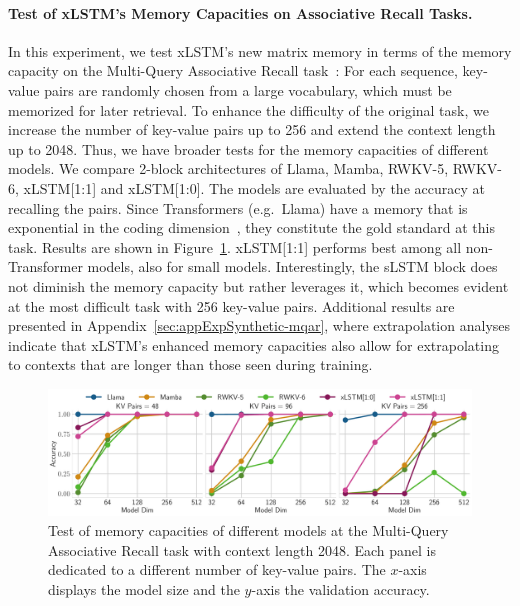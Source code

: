 \documentclass[dvipsnames]{article}
\begin{document}
\paragraph{Test of xLSTM's Memory Capacities on Associative Recall Tasks.}
In this experiment, we test xLSTM's new matrix memory in terms of the
memory capacity on the Multi-Query Associative Recall task~\citep{Arora:23arxiv}:
For each sequence, key-value pairs are randomly chosen
from a large vocabulary,
which must be memorized for later retrieval.
To enhance the difficulty of the original task, 
we increase the number of key-value pairs up 
to 256 and extend the context length up to 2048.
Thus, we have broader tests for the memory capacities of different models.
We compare 2-block architectures of 
Llama, Mamba, RWKV-5, RWKV-6, xLSTM[1:1] and xLSTM[1:0]. 
The models are evaluated by the accuracy at recalling the pairs.
Since Transformers (e.g.\ Llama) have a memory that is 
exponential in the coding dimension~\citep{Ramsauer:21}, 
they constitute the gold standard at this task.
Results are shown in Figure~\ref{fig:mqar-main}. 
xLSTM[1:1] performs best among all non-Transformer models, 
also for small models.
Interestingly, the sLSTM block does not diminish the memory capacity but rather 
leverages it, which becomes evident at the most difficult 
task with 256 key-value pairs.
Additional results are presented in Appendix~\ref{sec:appExpSynthetic-mqar},
where extrapolation analyses
indicate that xLSTM's enhanced memory capacities also allow for extrapolating to contexts that are longer than those seen during training.

\begin{figure}[h]
    \centering
    \includegraphics[width=\textwidth]{figures/MQAR_MainPaper.pdf}
    \caption{Test of memory capacities of different models at 
    the Multi-Query Associative Recall task with context length 2048. 
    Each panel is dedicated to a different number of key-value pairs. 
    The $x$-axis displays the model size and 
    the $y$-axis the validation accuracy.  \label{fig:mqar-main} }
\end{figure}
\end{document}
